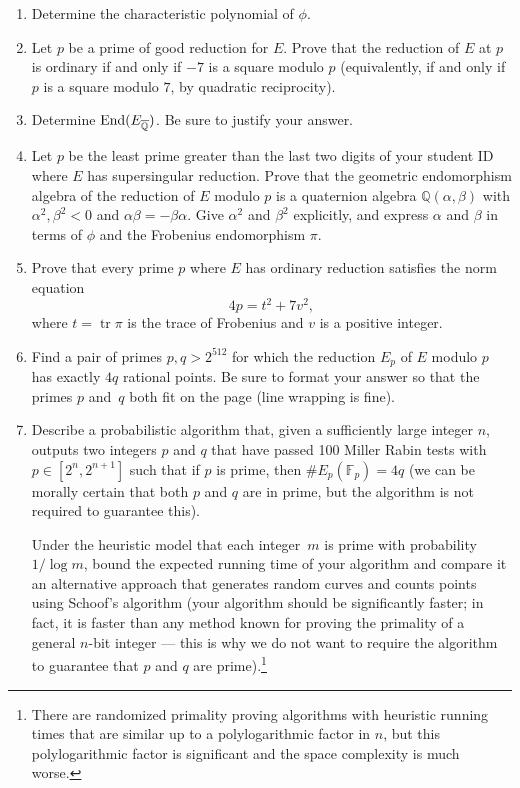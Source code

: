 \documentclass[11pt]{article}
\newcommand{\Fp}{\mathbb{F}_p}
\newcommand{\Q}{\mathbb{Q}}
\newcommand{\End}{{\rm End}}
\newcommand{\tr}{\operatorname{tr}}
\begin{document}
\begin{enumerate}[{\bf (a)}]
\item
Determine the characteristic polynomial of $\phi$.
\item
Let $p$ be a prime of good reduction for $E$.
Prove that the reduction of $E$ at $p$ is ordinary if and only if $-7$ is a square modulo $p$ (equivalently, if and only if $p$ is a square modulo $7$, by quadratic reciprocity).
\item
Determine $\End(E_{\overline{\Q}})$.  Be sure to justify your answer.
\item
Let $p$ be the least prime greater than the last two digits of your student ID where $E$ has supersingular reduction.
Prove that the geometric endomorphism algebra of the reduction of $E$ modulo $p$ is a quaternion algebra $\Q(\alpha,\beta)$ with $\alpha^2,\beta^2<0$ and $\alpha\beta=-\beta\alpha$.
Give $\alpha^2$ and $\beta^2$ explicitly, and express $\alpha$ and $\beta$ in terms of $\phi$ and the Frobenius endomorphism $\pi$.
\item
Prove that every prime $p$ where $E$ has ordinary reduction satisfies the norm equation
\[
4p=t^2+7v^2,
\]
where $t=\tr\pi$ is the trace of Frobenius and $v$ is a positive integer.
\item
Find a pair of primes $p,q>2^{512}$ for which the reduction $E_p$ of $E$ modulo $p$ has exactly $4q$ rational points.
Be sure to format your answer so that the primes $p$ and~$q$ both fit on the page (line wrapping is fine).
\item
Describe a probabilistic algorithm that, given a sufficiently large integer $n$, outputs two integers $p$ and $q$ that have passed 100 Miller Rabin tests with $p\in [2^n,2^{n+1}]$ such that if $p$ is prime, then $\#E_p(\Fp)=4q$ (we can be morally certain that both $p$ and $q$ are in prime, but the algorithm is not required to guarantee this).

Under the heuristic model that each integer~$m$ is prime with probability $1/\log m$, bound the expected running time of your algorithm and compare it an alternative approach that generates random curves and counts points using Schoof's algorithm (your algorithm should be significantly faster; in fact, it is faster than any method known for proving the primality of a general $n$-bit integer --- this is why we do not want to require the algorithm to guarantee that $p$ and $q$ are prime).\footnote{There are randomized primality proving algorithms with heuristic running times that are similar up to a polylogarithmic factor in $n$, but this polylogarithmic factor is significant and the space complexity is much worse.}
\end{enumerate}
\end{document}
